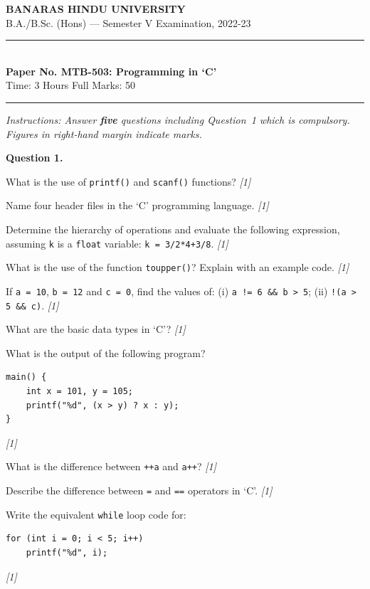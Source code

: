 \documentclass[11pt,a4paper]{article}
\newcommand{\pts}[1]{\hfill   \textit{[#1]}}
\begin{document}
\begin{center}
  {\large\bfseries BANARAS HINDU UNIVERSITY}\\[2pt]
  {\normalsize B.A./B.Sc. (Hons) --- Semester V Examination, 2022-23}\\[6pt]
  \rule{0.8\linewidth}{0.5pt}\\[6pt]
  {\large\bfseries Paper No. MTB-503: Programming in `C'}\\[4pt]
  {\normalsize Time: 3 Hours \hfill Full Marks: 50}
\end{center}
\rule{\linewidth}{0.4pt}
\smallskip



\noindent   \textit{Instructions: Answer   \textbf{five} questions including Question~1 which is compulsory. Figures in right-hand margin indicate marks.}
\bigskip




\noindent   \textbf{Question 1.}

\begin{parts}
  \item What is the use of   \texttt{printf()} and   \texttt{scanf()} functions? \pts{1}
  \item Name four header files in the `C' programming language. \pts{1}
  \item Determine the hierarchy of operations and evaluate the following expression, assuming   \texttt{k} is a   \texttt{float} variable:   \texttt{k = 3/2*4+3/8}. \pts{1}
  \item What is the use of the function   \texttt{toupper()}? Explain with an example code. \pts{1}
  \item If   \texttt{a = 10},   \texttt{b = 12} and   \texttt{c = 0}, find the values of: (i)   \texttt{a != 6 \&\& b > 5}; (ii)   \texttt{!(a > 5 \&\& c)}. \pts{1}
  \item What are the basic data types in `C'? \pts{1}
  \item What is the output of the following program?
  
\begin{lstlisting}
main() {
    int x = 101, y = 105;
    printf("%d", (x > y) ? x : y);
}
  \end{lstlisting} \pts{1}
  \item What is the difference between   \texttt{++a} and   \texttt{a++}? \pts{1}
  \item Describe the difference between   \texttt{=} and   \texttt{==} operators in `C'. \pts{1}
  \item Write the equivalent   \texttt{while} loop code for:
  
\begin{lstlisting}
for (int i = 0; i < 5; i++)
    printf("%d", i);
  \end{lstlisting} \pts{1}
\end{parts}
\end{document}
